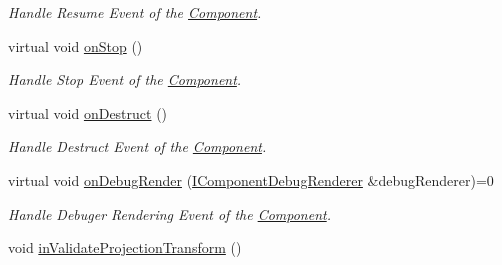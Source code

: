\begin{DoxyCompactItemize}
\begin{DoxyCompactList}\small\item\em Handle Resume Event of the \hyperlink{class_magnum_1_1_component}{Component}. \end{DoxyCompactList}\item 
virtual void \hyperlink{class_magnum_1_1_camera_component_a8c624bffc5605a56fb0fa2eb82c256ba}{on\+Stop} ()\hypertarget{class_magnum_1_1_camera_component_a8c624bffc5605a56fb0fa2eb82c256ba}{}\label{class_magnum_1_1_camera_component_a8c624bffc5605a56fb0fa2eb82c256ba}

\begin{DoxyCompactList}\small\item\em Handle Stop Event of the \hyperlink{class_magnum_1_1_component}{Component}. \end{DoxyCompactList}\item 
virtual void \hyperlink{class_magnum_1_1_camera_component_aea23765a5cf05c750e92a01e42a5a3b1}{on\+Destruct} ()\hypertarget{class_magnum_1_1_camera_component_aea23765a5cf05c750e92a01e42a5a3b1}{}\label{class_magnum_1_1_camera_component_aea23765a5cf05c750e92a01e42a5a3b1}

\begin{DoxyCompactList}\small\item\em Handle Destruct Event of the \hyperlink{class_magnum_1_1_component}{Component}. \end{DoxyCompactList}\item 
virtual void \hyperlink{class_magnum_1_1_camera_component_acb172977c04d0bc3736ab5d2b8d14f61}{on\+Debug\+Render} (\hyperlink{class_magnum_1_1_i_component_debug_renderer}{I\+Component\+Debug\+Renderer} \&debug\+Renderer)=0\hypertarget{class_magnum_1_1_camera_component_acb172977c04d0bc3736ab5d2b8d14f61}{}\label{class_magnum_1_1_camera_component_acb172977c04d0bc3736ab5d2b8d14f61}

\begin{DoxyCompactList}\small\item\em Handle Debuger Rendering Event of the \hyperlink{class_magnum_1_1_component}{Component}. \end{DoxyCompactList}\item 
void \hyperlink{class_magnum_1_1_camera_component_a84bbd217e6201fd89894e6f8a81e03a9}{in\+Validate\+Projection\+Transform} ()\hypertarget{class_magnum_1_1_camera_component_a84bbd217e6201fd89894e6f8a81e03a9}{}\label{class_magnum_1_1_camera_component_a84bbd217e6201fd89894e6f8a81e03a9}


\end{DoxyCompactItemize}
